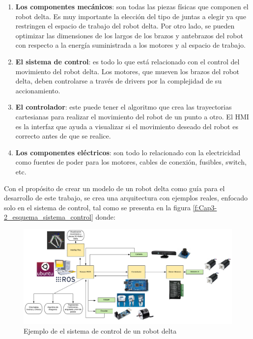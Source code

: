     \begin{enumerate}
        \item{ \textbf{Los componentes mecánicos}: son todas las piezas físicas que componen el robot delta. Es muy importante la elección del tipo de juntas a elegir ya que restringen el espacio de trabajo del robot delta. Por otro lado, se pueden optimizar las dimensiones de los largos de los brazos y antebrazos del robot con respecto a la energía suministrada a los motores y al espacio de trabajo.}
        \item{\textbf{El sistema de control}: es todo lo que está relacionado con el control del movimiento del robot delta. Los motores, que mueven los brazos del robot delta, deben controlarse a través de drivers por la complejidad de su accionamiento.}
        \item{ \textbf{El controlador}: este puede tener el algoritmo que crea las trayectorias cartesianas para realizar el movimiento del robot de un punto a otro. El HMI es la interfaz que ayuda a visualizar si el movimiento deseado del robot es correcto antes de que se realice.}
        \item{   \textbf{Los componentes eléctricos}: son todo lo relacionado con la electricidad como fuentes de poder para los motores, cables de conexión, fusibles, switch, etc.}
    \end{enumerate}

        \newpage

    Con el propósito de crear un modelo de un robot delta como guía para el desarrollo de este trabajo, se crea una arquitectura con ejemplos reales, enfocado solo en el sistema de control, tal como se presenta en la figura \eqref{f:Cap3-2_esquema_sistema_control} donde:

    \begin{figure}[h]
        \centering
        \includegraphics[width=1\linewidth]{Main/Chapter3/Images3/3-2/sistema-de-control.png}
        \caption{Ejemplo de el sistema de control de un robot delta}
        \label{f:Cap3-2_esquema_sistema_control}
    \end{figure}
    
